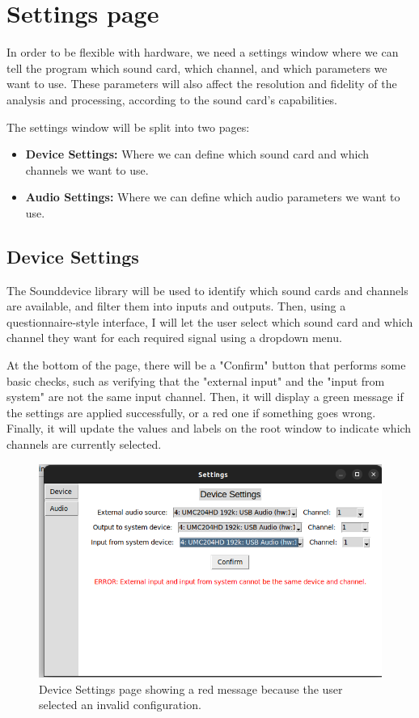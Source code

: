 \section{Settings page}

In order to be flexible with hardware, we need a settings window where we can tell the program which sound card, which channel, and which parameters we want to use. These parameters will also affect the resolution and fidelity of the analysis and processing, according to the sound card’s capabilities.

The settings window will be split into two pages:
\begin{itemize}
	\item \textbf{Device Settings:} Where we can define which sound card and which channels we want to use.
	\item \textbf{Audio Settings:} Where we can define which audio parameters we want to use.
\end{itemize}

\subsection{Device Settings}

The Sounddevice library will be used to identify which sound cards and channels are available, and filter them into inputs and outputs. Then, using a questionnaire-style interface, I will let the user select which sound card and which channel they want for each required signal using a dropdown menu.

At the bottom of the page, there will be a "Confirm" button that performs some basic checks, such as verifying that the "external input" and the "input from system" are not the same input channel. Then, it will display a green message if the settings are applied successfully, or a red one if something goes wrong. Finally, it will update the values and labels on the root window to indicate which channels are currently selected.

\begin{figure}[H]
	\centering
	\includegraphics[width=0.8
	\linewidth]{Figures/DevSet.png}
	\caption[Device setting page]{Device Settings page showing a red message because the user selected an invalid configuration.}
	\label{fig:Device Settings}
\end{figure}

